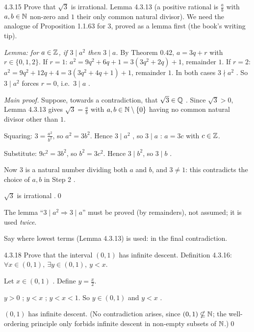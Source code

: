 \begin{bookex}[essential]{4.3.15}
Prove that $\sqrt3$ is irrational.
\solution
\given Lemma 4.3.13 (a positive rational is $\frac ab$ with $a,b\in\mathbb{N}$ non-zero and $1$ their only common natural divisor). We need the analogue of Proposition 1.1.63 for $3$, proved as a lemma first (the book's writing tip).
\begin{steps}
\item \emph{Lemma: for $a\in\mathbb{Z}$, if $3\mid a^2$ then $3\mid a$.} By Theorem 0.42, $a=3q+r$ with $r\in\{0,1,2\}$. If $r=1$: $a^2=9q^2+6q+1=3(3q^2+2q)+1$, remainder $1$. If $r=2$: $a^2=9q^2+12q+4=3(3q^2+4q+1)+1$, remainder $1$. In both cases $3\nmid a^2$ . So $3\mid a^2$ forces $r=0$, i.e.\ $3\mid a$ .
\item \emph{Main proof.} Suppose, towards a contradiction, that $\sqrt3\in\mathbb{Q}$ . Since $\sqrt3>0$, Lemma 4.3.13 gives $\sqrt3=\frac ab$ with $a,b\in\mathbb{N}\setminus\{0\}$ having no common natural divisor other than $1$.
\item Squaring: $3=\frac{a^2}{b^2}$, so $a^2=3b^2$. Hence $3\mid a^2$ , so $3\mid a$ : $a=3c$ with $c\in\mathbb{Z}$.
\item Substitute: $9c^2=3b^2$, so $b^2=3c^2$. Hence $3\mid b^2$, so $3\mid b$ .
\item Now $3$ is a natural number dividing both $a$ and $b$, and $3\ne1$: this contradicts the choice of $a,b$ in Step 2 .
\end{steps}
\conclusion $\sqrt3$ is irrational .\qed
\begin{compare}
\item The lemma ``$3\mid a^2\Rightarrow3\mid a$'' must be proved (by remainders), not assumed; it is used \emph{twice}.
\item Say where lowest terms (Lemma 4.3.13) is used: in the final contradiction.
\end{compare}
\end{bookex}

\begin{bookex}[recommended]{4.3.18}
Prove that the interval $(0,1)$ has infinite descent.
\solution
\given Definition 4.3.16: $\forall x\in(0,1),\ \exists y\in(0,1),\ y<x$.
\begin{steps}
\item Let $x\in(0,1)$ . Define $y=\frac x2$.
\item $y>0$ ; $y<x$ ; $y<x<1$. So $y\in(0,1)$ and $y<x$ .
\end{steps}
\conclusion $(0,1)$ has infinite descent. (No contradiction arises, since $(0,1)\nsubseteq\mathbb{N}$; the well-ordering principle only forbids infinite descent in non-empty subsets of $\mathbb{N}$.)\qed
\end{bookex}

